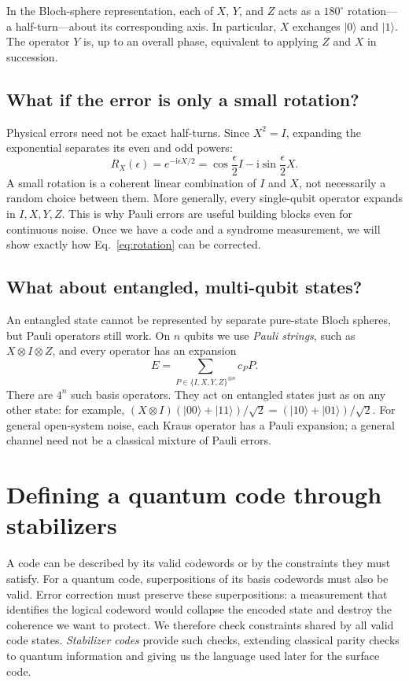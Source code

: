 \documentclass[11pt,a4paper]{article}
\newcommand{\ket}[1]{\lvert #1\rangle}
\newcommand{\ii}{\mathrm{i}}
\begin{document}
In the Bloch-sphere representation, each of \(X\), \(Y\), and \(Z\)
acts as a \(180^\circ\) rotation---a half-turn---about its corresponding
axis. In particular, \(X\) exchanges \(\ket{0}\) and \(\ket{1}\).
The operator \(Y\) is, up to an overall phase, equivalent to applying
\(Z\) and \(X\) in succession.

\subsection{What if the error is only a small rotation?}
Physical errors need not be exact half-turns. Since $X^2=I$, expanding the exponential separates its even and odd powers:
\begin{equation}\label{eq:rotation}
R_X(\epsilon)=e^{-\ii\epsilon X/2}
=\cos\frac\epsilon2 I-\ii\sin\frac\epsilon2 X.
\end{equation}
A small rotation is a coherent linear combination of $I$ and $X$, not necessarily a random choice between them. More generally, every single-qubit operator expands in $I,X,Y,Z$. This is why Pauli errors are useful building blocks even for continuous noise. Once we have a code and a syndrome measurement, we will show exactly how Eq.~\eqref{eq:rotation} can be corrected.

\subsection{What about entangled, multi-qubit states?}
An entangled state cannot be represented by separate pure-state Bloch spheres, but Pauli operators still work. On $n$ qubits we use \emph{Pauli strings}, such as $X\otimes I\otimes Z$, and every operator has an expansion
\begin{equation}\label{eq:pauli-expansion}
E=\sum_{P\in\{I,X,Y,Z\}^{\otimes n}}c_P P.
\end{equation}
There are $4^n$ such basis operators. They act on entangled states just as on any other state: for example, $(X\otimes I)(\ket{00}+\ket{11})/\sqrt2=(\ket{10}+\ket{01})/\sqrt2$. For general open-system noise, each Kraus operator has a Pauli expansion; a general channel need not be a classical mixture of Pauli errors.

\newpage
\section{Defining a quantum code through stabilizers}
A code can be described by its valid codewords or by the constraints they must satisfy. For a quantum code, superpositions of its basis codewords must also be valid. Error correction must preserve these superpositions: a measurement that identifies the logical codeword would collapse the encoded state and destroy the coherence we want to protect. We therefore check constraints shared by all valid code states. \emph{Stabilizer codes} provide such checks, extending classical parity checks to quantum information and giving us the language used later for the surface code.
\end{document}
